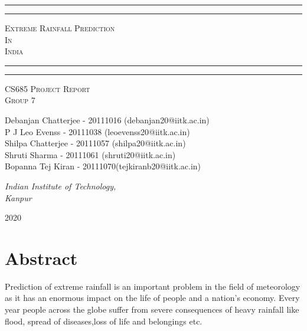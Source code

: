 \documentclass[11pt,a4paper]{article}
\begin{document}
\begin{titlepage}
	\centering %
	\vspace*{\baselineskip} 
	
	\rule{\textwidth}{1.6pt}\vspace*{-\baselineskip}\vspace*{2pt} %
	\rule{\textwidth}{0.4pt} %
	
	\vspace{0.75\baselineskip}
	{\scshape\LARGE Extreme Rainfall Prediction\\ In\\ India \\} 
	\vspace{0.75\baselineskip} 
	
	\rule{\textwidth}{0.4pt}\vspace*{-\baselineskip}\vspace{3.2pt}
	\rule{\textwidth}{1.6pt} 
	
	\vspace{2\baselineskip}
	{\scshape CS685 Project Report\\}
	\vspace*{3\baselineskip}
	{\scshape Group 7}
	
	\vspace{0.5\baselineskip}
	
	{\large  Debanjan Chatterjee - 20111016 (debanjan20@iitk.ac.in)\\P J Leo Evenss - 20111038 (leoevenss20@iitk.ac.in)\\ Shilpa Chatterjee - 20111057 (shilpa20@iitk.ac.in) \\Shruti Sharma - 20111061 (shruti20@iitk.ac.in)  \\ Bopanna Tej Kiran - 20111070(tejkiranb20@iitk.ac.in)}
	
	\vspace{2.8\baselineskip}
	\textit{Indian Institute of Technology, \\ Kanpur} 	
	\vspace{2.8\baselineskip}
	
	2020
\end{titlepage}
\section{Abstract}
Prediction of extreme rainfall is an important problem in the field of meteorology as it has an enormous impact on the life of people and a nation's economy. Every year people across the globe suffer from severe consequences of heavy rainfall like flood, spread of diseases,loss of life and belongings etc.\\
\end{document}
